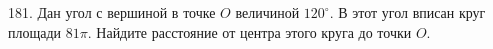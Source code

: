 181. Дан угол с вершиной в точке $O$ величиной $120^\circ.$ В этот угол вписан круг площади $81\pi.$ Найдите расстояние от центра этого круга до точки $O.$\\
